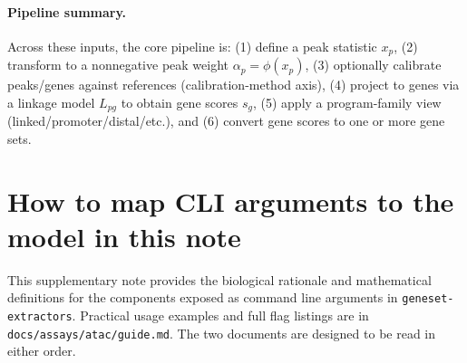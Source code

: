 \documentclass[11pt]{article}
\begin{document}
\paragraph{Pipeline summary.}
Across these inputs, the core pipeline is:
(1) define a peak statistic $x_p$,
(2) transform to a nonnegative peak weight $\alpha_p=\phi(x_p)$,
(3) optionally calibrate peaks/genes against references (calibration-method axis),
(4) project to genes via a linkage model $L_{pg}$ to obtain gene scores $s_g$,
(5) apply a program-family view (linked/promoter/distal/etc.),
and (6) convert gene scores to one or more gene sets.

\section{How to map CLI arguments to the model in this note}
\label{sec:doc_map}

This supplementary note provides the biological rationale and mathematical definitions for the components exposed as command line arguments in \texttt{geneset-extractors}. Practical usage examples and full flag listings are in \texttt{docs/assays/atac/guide.md}. The two documents are designed to be read in either order.
\end{document}
